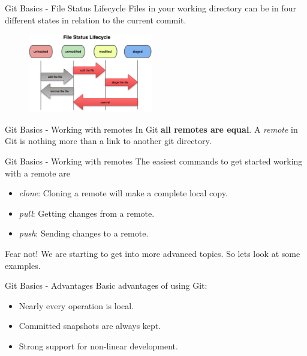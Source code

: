 \documentclass{beamer}
\def \figureHeight {130px}
\begin{document}
\begin{frame}{Git Basics - File Status Lifecycle}
	Files in your working directory can be in four different states in relation to the current commit.
		\begin{figure}
		\includegraphics[height=\figureHeight]{images/file-status-lifecycle.png}
	\end{figure}
\end{frame}

\begin{frame}{Git Basics - Working with remotes}
	In Git {\bf all remotes are equal}.
	\vskip15pt
	A \emph{remote} in Git is nothing more than a link to another git directory.
\end{frame}

\begin{frame}{Git Basics - Working with remotes}
	The easiest commands to get started working with a remote are
	\begin{itemize}
		\item \emph{clone}: Cloning a remote will make a complete local copy.
		\item \emph{pull}: Getting changes from a remote.
		\item \emph{push}: Sending changes to a remote.
	\end{itemize}
	\vskip15pt
	Fear not! We are starting to get into more advanced topics. So lets look at some examples.
\end{frame}

\begin{frame}{Git Basics - Advantages}
	Basic advantages of using Git:
	\begin{itemize}
		\item Nearly every operation is local.
		\item Committed snapshots are always kept.
		\item Strong support for non-linear development.
	\end{itemize}
\end{frame}
\end{document}
